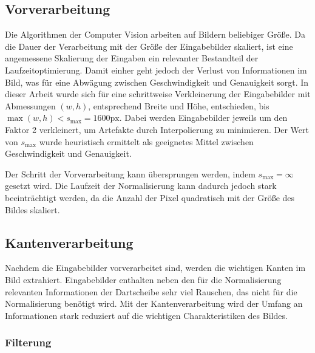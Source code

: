
\subsection{Vorverarbeitung}
\label{sec:vorverarbeitung}

Die Algorithmen der Computer Vision arbeiten auf Bildern beliebiger Größe. Da die Dauer der Verarbeitung mit der Größe der Eingabebilder skaliert, ist eine angemessene Skalierung der Eingaben ein relevanter Bestandteil der Laufzeitoptimierung. Damit einher geht jedoch der Verlust von Informationen im Bild, was für eine Abwägung zwischen Geschwindigkeit und Genauigkeit sorgt. In dieser Arbeit wurde sich für eine schrittweise Verkleinerung der Eingabebilder mit Abmessungen $(w, h)$, entsprechend Breite und Höhe, entschieden, bis $\max (w, h) < s_\text{max} = 1600\text{px}$. Dabei werden Eingabebilder jeweils um den Faktor 2 verkleinert, um Artefakte durch Interpolierung zu minimieren. Der Wert von $s_\text{max}$ wurde heuristisch ermittelt als geeignetes Mittel zwischen Geschwindigkeit und Genauigkeit.

Der Schritt der Vorverarbeitung kann übersprungen werden, indem $s_\text{max} = \infty$ gesetzt wird. Die Laufzeit der Normalisierung kann dadurch jedoch stark beeinträchtigt werden, da die Anzahl der Pixel quadratisch mit der Größe des Bildes skaliert.


\subsection{Kantenverarbeitung}
\label{sec:kanten}

Nachdem die Eingabebilder vorverarbeitet sind, werden die wichtigen Kanten im Bild extrahiert. Eingabebilder enthalten neben den für die Normalisierung relevanten Informationen der Dartscheibe sehr viel Rauschen, das nicht für die Normalisierung benötigt wird. Mit der Kantenverarbeitung wird der Umfang an Informationen stark reduziert auf die wichtigen Charakteristiken des Bildes.

\subsubsection{Filterung}
\label{sec:filterung}

